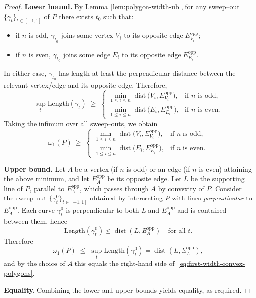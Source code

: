 \begin{proof}
\textbf{Lower bound.} 
By Lemma~\ref{lem:polygon-width-ub}, for any sweep--out 
$\{\gamma_t\}_{t\in[-1,1]}$ of $P$ there exists $t_0$ such that:
\begin{itemize}
    \item if $n$ is odd, $\gamma_{t_0}$ joins some vertex $V_i$ to its opposite edge $E_{V_i}^{\mathrm{opp}}$;
    \item if $n$ is even, $\gamma_{t_0}$ joins some edge $E_i$ to its opposite edge $E_{E_i}^{\mathrm{opp}}$.
\end{itemize}
In either case, $\gamma_{t_0}$ has length at least the perpendicular distance between the relevant vertex/edge and its opposite edge. Therefore,
\[
\sup_{t} \mathrm{Length}(\gamma_t) \;\ge\;
\begin{cases}
    \displaystyle \min_{1\le i\le n} \operatorname{dist}\!\big(V_i,E_{V_i}^{\mathrm{opp}}\big), & \text{if $n$ is odd},\\[0.8em]
    \displaystyle \min_{1\le i\le n} \operatorname{dist}\!\big(E_i,E_{E_i}^{\mathrm{opp}}\big), & \text{if $n$ is even}.
\end{cases}
\]
Taking the infimum over all sweep--outs, we obtain
\[
\omega_1(P) \;\ge\;
\begin{cases}
    \displaystyle \min_{1\le i\le n} \operatorname{dist}\!\big(V_i,E_{V_i}^{\mathrm{opp}}\big), & \text{if $n$ is odd},\\[0.8em]
    \displaystyle \min_{1\le i\le n} \operatorname{dist}\!\big(E_i,E_{E_i}^{\mathrm{opp}}\big), & \text{if $n$ is even}.
\end{cases}
\]

\medskip
\noindent\textbf{Upper bound.} 
Let $A$ be a vertex (if $n$ is odd) or an edge (if $n$ is even) attaining the above minimum, and let $E_A^{\mathrm{opp}}$ be its opposite edge. Let $L$ be the supporting line of $P$, parallel to $E_A^{\mathrm{opp}}$, which passes through $A$ by convexity of $P$. Consider the sweep--out $\{\gamma_t^0\}_{t\in[-1,1]}$ obtained by intersecting $P$ with lines \emph{perpendicular} to $E_A^{\mathrm{opp}}$. Each curve $\gamma_t^0$ is perpendicular to both $L$ and $E_A^{\mathrm{opp}}$ and is contained between them, hence
\[
\mathrm{Length}(\gamma_t^0) \leq \operatorname{dist}(L,E_A^{\mathrm{opp}})
\quad \text{for all } t.
\]
Therefore
\[
\omega_1(P) \;\le\; \sup_t \mathrm{Length}(\gamma_t^0) 
= \operatorname{dist}(L,E_A^{\mathrm{opp}}),
\]
and by the choice of $A$ this equals the right-hand side of~\eqref{eq:first-width-convex-polygons}.

\noindent \textbf{Equality.} Combining the lower and upper bounds yields equality, as required.
\end{proof}